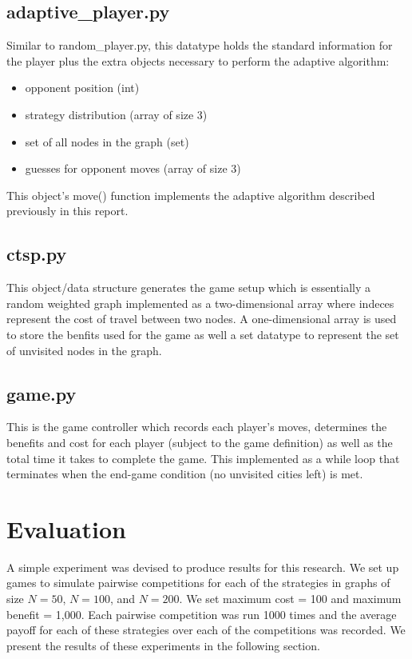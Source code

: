 \documentclass[pageno]{jpaper}
\begin{document}
\subsection{adaptive\_player.py}
Similar to random\_player.py, this datatype holds the standard information for the player plus the extra objects necessary to perform the adaptive algorithm:

\begin{itemize}
	\item opponent position (int)
	\item strategy distribution (array of size 3)
	\item set of all nodes in the graph (set)
	\item guesses for opponent moves (array of size 3)
\end{itemize}

This object's move() function implements the adaptive algorithm described previously in this report.

\subsection{ctsp.py}

This object/data structure generates the game setup which is essentially a random weighted graph implemented as a two-dimensional array where indeces represent the cost of travel between two nodes. A one-dimensional array is used to store the benfits used for the game as well a set datatype to represent the set of unvisited nodes in the graph.

\subsection{game.py}

This is the game controller which records each player's moves, determines the benefits and cost for each player (subject to the game definition) as well as the total time it takes to complete the game. This implemented as a while loop that terminates when the end-game condition (no unvisited cities left) is met.
\section{Evaluation}

A simple experiment was devised to produce results for this research. We set up games to simulate pairwise competitions for each of the strategies in graphs of size $N = 50$, $N = 100$, and $N = 200$.
We set maximum cost = 100 and maximum benefit = 1,000. Each pairwise competition was run 1000 times and the average payoff for each of these strategies over each of the competitions was recorded. We present the results of these experiments in the following section.
\end{document}

